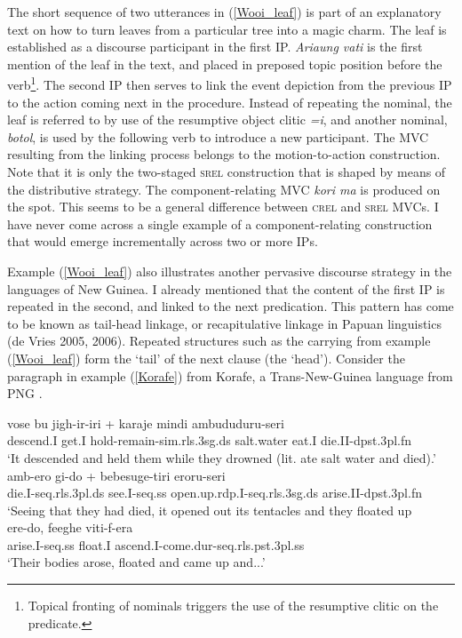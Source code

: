 The short sequence of two utterances in (\ref{Wooi_leaf}) is part of an explanatory text on how to turn leaves from a particular tree into a magic charm. The leaf is established as a discourse participant in the first IP. \textit{Ariaung vati} is the first mention of the leaf in the text, and placed in preposed topic position before the verb\footnote{Topical fronting of nominals triggers the use of the resumptive clitic on the predicate.}. The second IP then serves to link the event depiction from the previous IP to the action coming next in the procedure. Instead of repeating the nominal, the leaf is referred to by use of the resumptive object clitic \textit{=i}, and another nominal, \textit{botol}, is used by the following verb to introduce a new participant. The MVC resulting from the linking process belongs to the motion-to-action construction. Note that it is only the two-staged \textsc{srel} construction that is shaped by means of the distributive strategy. The component-relating MVC \textit{kori ma} is produced on the spot. This seems to be a general difference between \textsc{crel} and \textsc{srel} MVCs. I have never come across a single example of a component-relating construction that would emerge incrementally across two or more IPs.

Example (\ref{Wooi_leaf}) also illustrates another pervasive discourse strategy in the languages of New Guinea. I already mentioned that the content of the first IP is repeated in the second, and linked to the next predication. This pattern has come to be known as tail-head linkage, or recapitulative linkage in Papuan linguistics (de Vries 2005, 2006). Repeated structures such as the carrying from example (\ref{Wooi_leaf}) form the `tail' of the next clause (the `head'). Consider the paragraph in example (\ref{Korafe}) from Korafe, a Trans-New-Guinea language from PNG \parencite{farr1999interface}.

\pex \label{Korafe}
\a
\gll vose bu jigh-ir-iri + karaje mindi ambududuru-seri \\
descend.I get.I hold-remain-\acs{sim}.\acs{rls}.3\acs{sg}.\acs{ds} salt.water eat.I die.II-\acs{dpst}.3\acs{pl}.\acs{fn} \\
\glft `It descended and held them while they drowned (lit. ate salt water and died).' \\ 
\z
\a
\gll amb-ero gi-do + bebesuge-tiri eroru-seri \\
die.I-\acs{seq}.\acs{rls}.3\acs{pl}.\acs{ds} see.I-\acs{seq}.\acs{ss} open.up.\acs{rdp}.I-\acs{seq}.\acs{rls}.3\acs{sg}.\acs{ds} arise.II-\acs{dpst}.3\acs{pl}.\acs{fn} \\
\glft `Seeing that they had died, it opened out its tentacles and they floated up \\ 
\z
\a
\gll ere-do, feeghe viti-f-era \\ 
arise.I-\acs{seq}.\acs{ss} float.I ascend.I-come.\acs{dur}-\acs{seq}.\acs{rls}.\acs{pst}.3\acs{pl}.\acs{ss} \\
\glft `Their bodies arose, floated and came up and...' \\ 
\z
\xe

